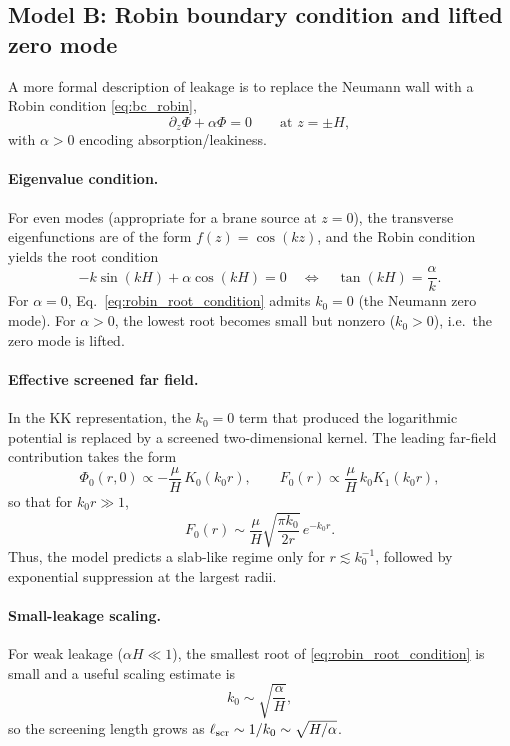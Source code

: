 \documentclass[11pt]{article}
\begin{document}
\subsection{Model B: Robin boundary condition and lifted zero mode}
\label{sec:leaky_robin}

A more formal description of leakage is to replace the Neumann wall with a Robin condition
\eqref{eq:bc_robin},
\begin{equation}
  \partial_z \Phi + \alpha \Phi = 0 \qquad \text{at } z=\pm H,
\end{equation}
with $\alpha>0$ encoding absorption/leakiness.

\paragraph{Eigenvalue condition.}
For even modes (appropriate for a brane source at $z=0$), the transverse eigenfunctions are of the
form $f(z)=\cos(k z)$, and the Robin condition yields the root condition
\begin{equation}
  -k\sin(kH)+\alpha\cos(kH)=0
  \quad\Longleftrightarrow\quad
  \tan(kH)=\frac{\alpha}{k}.
  \label{eq:robin_root_condition}
\end{equation}
For $\alpha=0$, Eq.~\eqref{eq:robin_root_condition} admits $k_0=0$ (the Neumann zero mode).
For $\alpha>0$, the lowest root becomes small but nonzero ($k_0>0$), i.e.\ the zero mode is lifted.

\paragraph{Effective screened far field.}
In the KK representation, the $k_0=0$ term that produced the logarithmic potential is replaced by a
screened two-dimensional kernel.  The leading far-field contribution takes the form
\begin{equation}
  \Phi_0(r,0)\propto -\frac{\mu}{H}\,K_0(k_0 r),
  \qquad
  F_0(r)\propto \frac{\mu}{H}\,k_0 K_1(k_0 r),
  \label{eq:robin_screened_force}
\end{equation}
so that for $k_0 r\gg 1$,
\begin{equation}
  F_0(r) \sim \frac{\mu}{H}\sqrt{\frac{\pi k_0}{2r}}\,e^{-k_0 r}.
  \label{eq:robin_screened_asymptote}
\end{equation}
Thus, the model predicts a slab-like regime only for $r\lesssim k_0^{-1}$, followed by exponential
suppression at the largest radii.

\paragraph{Small-leakage scaling.}
For weak leakage ($\alpha H\ll 1$), the smallest root of \eqref{eq:robin_root_condition} is small and
a useful scaling estimate is
\begin{equation}
  k_0 \sim \sqrt{\frac{\alpha}{H}},
  \label{eq:k0_scaling}
\end{equation}
so the screening length grows as $\ell_{\rm scr}\sim 1/k_0\sim \sqrt{H/\alpha}$.
\end{document}
